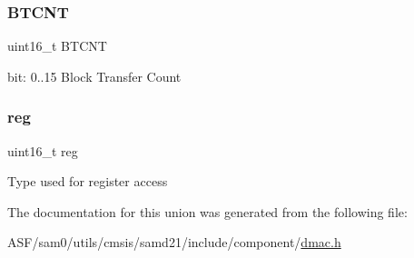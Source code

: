 \subsubsection{\texorpdfstring{BTCNT}{BTCNT}}
{\footnotesize\ttfamily uint16\+\_\+t B\+T\+C\+NT}

bit\+: 0..15 Block Transfer Count \mbox{\label{union_d_m_a_c___b_t_c_n_t___type_a11760f5020019f4aa8cb02e694f7cc44}} 
\subsubsection{\texorpdfstring{reg}{reg}}
{\footnotesize\ttfamily uint16\+\_\+t reg}

Type used for register access 

The documentation for this union was generated from the following file\+:\begin{DoxyCompactItemize}
\item 
A\+S\+F/sam0/utils/cmsis/samd21/include/component/\mbox{\hyperlink{component_2dmac_8h}{dmac.\+h}}\end{DoxyCompactItemize}
